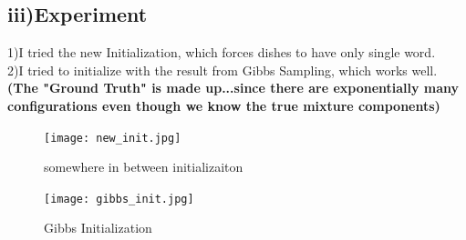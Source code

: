 \documentclass{article}
\begin{document}
\begin{spacing}{1.1}
\subsection{iii)Experiment}
1)I tried the new Initialization, which forces dishes to have only single word.\\
2)I tried to initialize with the result from Gibbs Sampling, which works well.\\
{\bf(The "Ground Truth" is made up...since there are exponentially many 
configurations even though we know the true mixture components)}\\
\begin{figure}[h] 
  \begin{minipage}[b]{0.5\textwidth} 
    \centering 
    \texttt{[image: new\_init.jpg]} 
    \caption{somewhere in between initializaiton} 
    \label{fig:by:table} 
  \end{minipage}%
  \begin{minipage}[b]{0.5\textwidth} 
    \centering 
    \texttt{[image: gibbs\_init.jpg]} 
    \caption{Gibbs Initialization}
    \label{fig:by:table}  
   \end{minipage}%
\end{figure}


\end{spacing}
\end{document}
